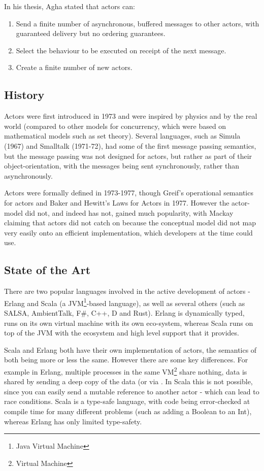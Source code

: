 \documentclass[11pt,a4paper]{report}
\begin{document}
In his thesis, Agha\cite{agha1985} stated that actors can:
\begin{enumerate}[noitemsep]
	\item Send a finite number of asynchronous, buffered messages to other actors, with guaranteed delivery but no ordering guarantees.
	\item Select the behaviour to be executed on receipt of the next message.
	\item Create a finite number of new actors.
\end{enumerate}

\subsection{History}

Actors were first introduced in 1973\cite{hewitt1973} and were inspired by physics and by the real world\cite{hewitt2006} (compared to other models for concurrency, which were based on mathematical models such as set theory\cite{Milner:1993:EIT:151233.151240}).
Several languages, such as Simula (1967) and Smalltalk (1971-72), had some of the first message passing semantics, but the message passing was not designed for actors, but rather as part of their object-orientation, with the messages being sent synchronously, rather than asynchronously.

Actors were formally defined in 1973-1977, though Greif's operational semantics for actors\cite{grief1975} and Baker and Hewitt's Laws for Actors in 1977\cite{hewitt1977}.
However the actor-model did not, and indeed has not, gained much popularity, with Mackay\cite{mackay97} claiming that actors did not catch on because the conceptual model did not map very easily onto an efficient implementation, which developers at the time could use.

\subsection{State of the Art}

There are two popular languages involved in the active development of actors - Erlang and Scala (a JVM\footnote{Java Virtual Machine}-based language), as well as several others (such as SALSA, AmbientTalk, F\#, C++, D and Rust).
Erlang is dynamically typed, runs on its own virtual machine with its own eco-system, whereas Scala runs on top of the JVM with the ecosystem and high level support that it provides.

Scala and Erlang both have their own implementation of actors, the semantics of both being more or less the same.
However there are some key differences.
For example in Erlang, multiple processes in the same VM\footnote{Virtual Machine} share nothing, data is shared by sending a deep copy of the data (or via .
In Scala this is not possible, since you can easily send a mutable reference to another actor - which can lead to race conditions\cite{akka-mutable}.
Scala is a type-safe language, with code being error-checked at compile time for many different problems (such as adding a Boolean to an Int), whereas Erlang has only limited type-safety.
\end{document}
